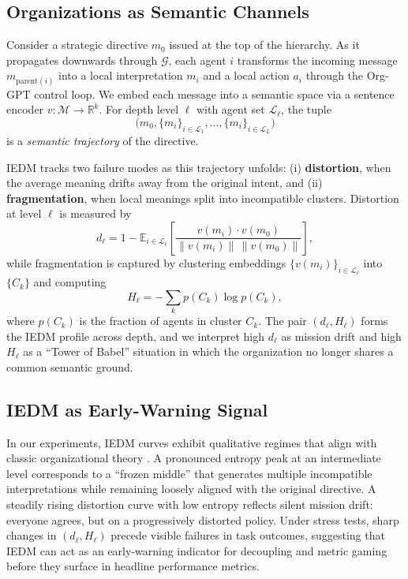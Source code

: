 \documentclass{article}
\begin{document}
\subsection{Organizations as Semantic Channels}

Consider a strategic directive $m_0$ issued at the top of the hierarchy. As it propagates downwards through $\mathcal{G}$, each agent $i$ transforms the incoming message $m_{\text{parent}(i)}$ into a local interpretation $m_i$ and a local action $a_i$ through the Org-GPT control loop. We embed each message into a semantic space via a sentence encoder $v : \mathcal{M} \rightarrow \mathbb{R}^k$. For depth level $\ell$ with agent set $\mathcal{L}_\ell$, the tuple
\[
    \bigl(m_0, \{m_i\}_{i \in \mathcal{L}_1}, \dots, \{m_i\}_{i \in \mathcal{L}_L}\bigr)
\]
is a \emph{semantic trajectory} of the directive.

IEDM tracks two failure modes as this trajectory unfolds:
(i) \textbf{distortion}, when the average meaning drifts away from the original intent, and
(ii) \textbf{fragmentation}, when local meanings split into incompatible clusters. Distortion at level $\ell$ is measured by
\begin{equation}
    d_\ell = 1 - \mathbb{E}_{i \in \mathcal{L}_\ell}
    \left[
        \frac{v(m_i) \cdot v(m_0)}{\|v(m_i)\| \, \|v(m_0)\|}
    \right],
\end{equation}
while fragmentation is captured by clustering embeddings $\{v(m_i)\}_{i \in \mathcal{L}_\ell}$ into $\{C_k\}$ and computing
\begin{equation}
    H_\ell = - \sum_k p(C_k) \log p(C_k),
\end{equation}
where $p(C_k)$ is the fraction of agents in cluster $C_k$. The pair $(d_\ell, H_\ell)$ forms the IEDM profile across depth, and we interpret high $d_\ell$ as mission drift and high $H_\ell$ as a ``Tower of Babel'' situation in which the organization no longer shares a common semantic ground.

\subsection{IEDM as Early-Warning Signal}

In our experiments, IEDM curves exhibit qualitative regimes that align with classic organizational theory \citep{meyer1977institutionalized,weick1976educational,clark1983higher,scheffer2009early}. A pronounced entropy peak at an intermediate level corresponds to a ``frozen middle'' that generates multiple incompatible interpretations while remaining loosely aligned with the original directive. A steadily rising distortion curve with low entropy reflects silent mission drift: everyone agrees, but on a progressively distorted policy. Under stress tests, sharp changes in $(d_\ell, H_\ell)$ precede visible failures in task outcomes, suggesting that IEDM can act as an early-warning indicator for decoupling and metric gaming before they surface in headline performance metrics.
\end{document}
